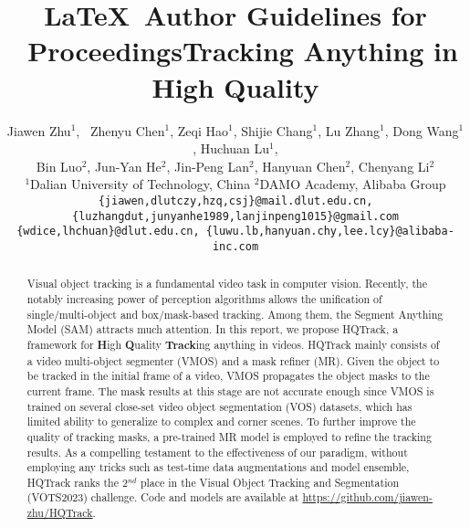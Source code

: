 \documentclass[10pt,twocolumn,letterpaper]{article}
\begin{document}
\title{\LaTeX\ Author Guidelines for \confName~Proceedings}

\title{Tracking Anything in High Quality}

\author{Jiawen Zhu$^1$, \ Zhenyu Chen$^1$\protect, Zeqi Hao$^1$, Shijie Chang$^1$, Lu Zhang$^1$, Dong Wang$^1$, Huchuan Lu$^{1}$, \\
Bin Luo$^{2}$,  Jun-Yan He$^{2}$, Jin-Peng Lan$^{2}$, Hanyuan Chen$^{2}$, Chenyang Li$^{2}$\\
$^1$Dalian University of Technology, China \quad
$^2$DAMO Academy, Alibaba Group \\
{\tt\small \{jiawen,dlutczy,hzq,csj\}@mail.dlut.edu.cn, \{luzhangdut,junyanhe1989,lanjinpeng1015\}@gmail.com} \\
{\tt\small \{wdice,lhchuan\}@dlut.edu.cn, \{luwu.lb,hanyuan.chy,lee.lcy\}@alibaba-inc.com}
}

\maketitle

\begin{abstract}
	Visual object tracking is a fundamental video task in computer vision.
	Recently, the notably increasing power of perception algorithms allows the unification of single/multi-object and box/mask-based tracking.
	Among them, the Segment Anything Model (SAM) attracts much attention.
	In this report, we propose HQTrack, a framework for \textbf{H}igh \textbf{Q}uality \textbf{Track}ing anything in videos. HQTrack mainly consists of a video multi-object segmenter (VMOS) and a mask refiner (MR).
	Given the object to be tracked in the initial frame of a video, VMOS propagates the object masks to the current frame.
	The mask results at this stage are not accurate enough since VMOS is trained on several close-set video object segmentation (VOS) datasets, which has limited ability to generalize to complex and corner scenes.
	To further improve the quality of tracking masks, a pre-trained MR model is employed to refine the tracking results.
As a compelling testament to the effectiveness of our paradigm, 
	without employing any tricks such as test-time data augmentations and model ensemble,
	HQTrack ranks the 2$^{nd}$ place in the Visual Object Tracking and Segmentation (VOTS2023) challenge.
	Code and models are available at \href{https://github.com/jiawen-zhu/HQTrack}{https://github.com/jiawen-zhu/HQTrack}.
 \end{abstract} 
\end{document}
